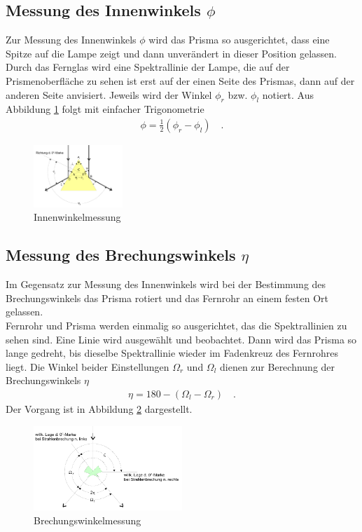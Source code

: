 \subsection{Messung des Innenwinkels $\phi$}
Zur Messung des Innenwinkels $\phi$ wird das Prisma so ausgerichtet, dass eine Spitze auf die Lampe zeigt und dann unverändert in dieser Position gelassen. Durch das Fernglas wird eine Spektrallinie der Lampe, die auf der Prismenoberfläche zu sehen ist erst auf der einen Seite des Prismas, dann auf der anderen Seite anvisiert. Jeweils wird der Winkel $\phi_r$ bzw. $\phi_l$ notiert. Aus Abbildung \ref{fig:prisma2} folgt mit einfacher Trigonometrie
\begin{align}\label{Phi}
	\phi = \frac{1}{2} (\phi_r - \phi_l) \quad.
\end{align}

\begin{figure}[h!]
	\centering
	\includegraphics[width=0.3\textwidth]{Prisma2.png}
	\caption{Innenwinkelmessung}
	\label{fig:prisma2}
\end{figure}

\subsection{Messung des Brechungswinkels $\eta$}
Im Gegensatz zur Messung des Innenwinkels wird bei der Bestimmung des Brechungswinkels das Prisma rotiert und das Fernrohr an einem festen Ort gelassen. \\
Fernrohr und Prisma werden einmalig so ausgerichtet, das die Spektrallinien zu sehen sind. Eine Linie wird ausgewählt und beobachtet. Dann wird das Prisma so lange gedreht, bis dieselbe Spektrallinie wieder im Fadenkreuz des Fernrohres liegt. Die Winkel beider Einstellungen $\Omega_r$ und $\Omega_l$ dienen zur Berechnung der Brechungswinkels $\eta$
\begin{align}\label{Eta}
	\eta = 180 - (\Omega_l - \Omega_r) \quad .
\end{align}
Der Vorgang ist in Abbildung \ref{fig:prisma3} dargestellt.

\begin{figure}[h!]
	\centering
	\includegraphics[width=0.5\textwidth]{Prisma3.png}
	\caption{Brechungswinkelmessung}
	\label{fig:prisma3}
\end{figure}

